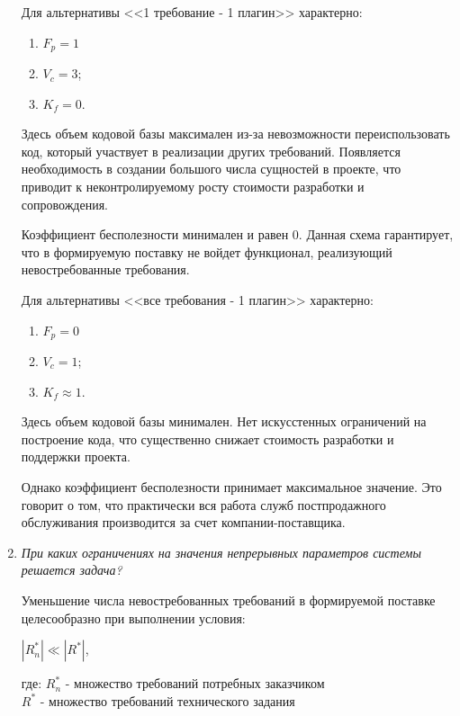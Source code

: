 \documentclass{article}
\begin{document}
\begin{enumerate}
        Для альтернативы <<1 требование - 1 плагин>> характерно:
        \begin{enumerate}
            \item $F_{p} = 1$
            \item $V_{c} = 3$;
            \item $K_{f} = 0$.
        \end{enumerate}

        Здесь объем кодовой базы максимален из-за невозможности переиспользовать код, который участвует в реализации других требований. Появляется необходимость в создании большого числа сущностей в проекте, что приводит к неконтролируемому росту стоимости разработки и сопровождения.

        Коэффициент бесполезности минимален и равен 0. Данная схема гарантирует, что в формируемую поставку не войдет функционал, реализующий невостребованные требования.

        Для альтернативы <<все требования - 1 плагин>> характерно:
        \begin{enumerate}
            \item $F_{p} = 0$
            \item $V_{c} = 1$;
            \item $K_{f} \approx 1$.
        \end{enumerate}

        Здесь объем кодовой базы минимален. Нет искусстенных ограничений на построение кода, что существенно снижает стоимость разработки и поддержки проекта.

        Однако коэффициент бесполезности принимает максимальное значение. Это говорит о том, что практически вся работа служб постпродажного обслуживания производится за счет компании-поставщика.



        \item \textit{При каких ограничениях на значения непрерывных параметров системы решается задача?}

        Уменьшение числа невостребованных требований в формируемой поставке целесообразно при выполнении условия: 
        \begin{center}
            $|R^*_{n}| \ll |R^*|$,
        \end{center}

        где: $R^*_{n}$ - множество требований потребных заказчиком \\
        $R^*$ - множество требований технического задания


\end{enumerate}
\end{document}
